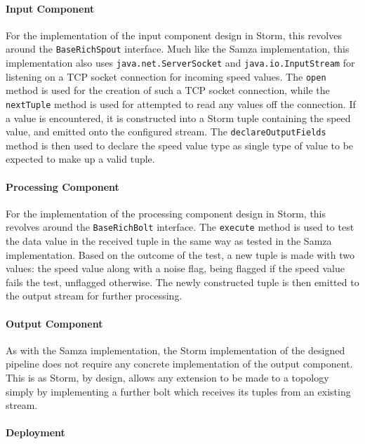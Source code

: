 \paragraph{Input Component}

For the implementation of the input component design in Storm, this revolves around the \texttt{BaseRichSpout} interface.
Much like the Samza implementation, this implementation also uses \texttt{java.net.ServerSocket} and \texttt{java.io.InputStream}
for listening on a TCP socket connection for incoming speed values. The \texttt{open} method is used for the creation
of such a TCP socket connection, while the \texttt{nextTuple} method is used for attempted to read any values off the
connection. If a value is encountered, it is constructed into a Storm tuple containing the speed value, and emitted onto
the configured stream. The \texttt{declareOutputFields} method is then used to declare the speed value type as single
type of value to be expected to make up a valid tuple.

\paragraph{Processing Component}

For the implementation of the processing component design in Storm, this revolves around the \texttt{BaseRichBolt} interface.
The \texttt{execute} method is used to test the data value in the received tuple in the same way as tested in the Samza
implementation. Based on the outcome of the test, a new tuple is made with two values: the speed value along with a
noise flag, being flagged if the speed value fails the test, unflagged otherwise. The newly constructed tuple is then
emitted to the output stream for further processing.

\paragraph{Output Component}

As with the Samza implementation, the Storm implementation of the designed pipeline does not require any concrete implementation
of the output component. This is as Storm, by design, allows any extension to be made to a topology simply by implementing
a further bolt which receives its tuples from an existing stream.

\paragraph{Deployment}

